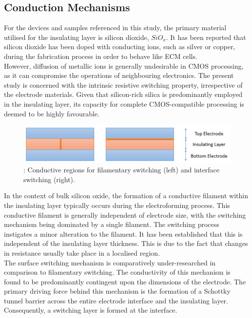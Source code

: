 \subsection[Conduction Mechanisms]{Conduction Mechanisms}

\noindent For the devices and samples referenced in this study, the primary material utilised for the insulating layer is silicon dioxide, $SiO_x$. It has been reported that silicon dioxide has been doped with conducting ions, such as silver or copper, during the fabrication process in order to behave like ECM cells. \\

\noindent However, diffusion of metallic ions is generally undesirable in CMOS processing, as it can compromise the operations of neighbouring electronics. The present study is concerned with the intrinsic resistive switching property, irrespective of the electrode materials. Given that silicon-rich silica is predominantly employed in the insulating layer, its capacity for complete CMOS-compatible processing is deemed to be highly favourable. \\

\begin{figure}[htbp!] 
    \centering    
    \includegraphics[width=1\textwidth]{Chapter3/Figs/t.png}
    \caption[: Conductive regions for filamentary switching and interface switching.]{: Conductive regions for filamentary switching (left) and interface switching (right).}
    \label{fig:3t}
\end{figure}

\noindent In the context of bulk silicon oxide, the formation of a conductive filament within the insulating layer typically occurs during the electroforming process. This conductive filament is generally independent of electrode size, with the switching mechanism being dominated by a single filament. The switching process instigates a minor alteration to the filament. It has been established that this is independent of the insulating layer thickness. This is due to the fact that changes in resistance usually take place in a localised region.\\

\noindent The surface switching mechanism is comparatively under-researched in comparison to filamentary switching. The conductivity of this mechanism is found to be predominantly contingent upon the dimensions of the electrode. The primary driving force behind this mechanism is the formation of a Schottky tunnel barrier across the entire electrode interface and the insulating layer. Consequently, a switching layer is formed at the interface.\\

